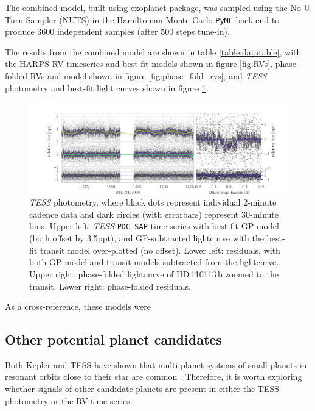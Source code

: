 \documentclass[fleqn,usenatbib]{mnras}
\newcommand{\tess}{{\it TESS}}
\newcommand{\harps}{{HARPS}}
\newcommand{\Tplanet}{HD\,110113\,b}
\begin{document}
The combined model, built using \textsf{exoplanet} \citep{exoplanet} package, was sampled using the No-U Turn Sampler (NUTS) in the Hamiltonian Monte Carlo \texttt{PyMC} back-end \citep{exoplanet:pymc3} to produce 3600 independent samples (after 500 steps tune-in).

The results from the combined model are shown in table \ref{table:datatable}, with the \harps{} RV timeseries and best-fit models shown in figure \ref{fig:RVs}, phase-folded RVs and model shown in figure \ref{fig:phase_fold_rvs}, and \tess{} photometry and best-fit light curves shown in figure \ref{fig:photometry}.

\onecolumn
\begin{figure}
	\includegraphics[width=\textwidth]{Combined_phot_plot_3_GPs}
    \caption{\tess{} photometry, where black dots represent individual 2-minute cadence data and dark circles (with errorbars) represent 30-minute bins. Upper left: \tess{} \texttt{PDC\_SAP} time series with best-fit GP model (both offset by 3.5ppt), and GP-subtracted lightcurve with the best-fit transit model over-plotted (no offset). Lower left: residuals, with both GP model and transit models subtracted from the lightcurve. Upper right: phase-folded lightcurve of \Tplanet{} zoomed to the transit. Lower right: phase-folded residuals. }
    \label{fig:photometry}
\end{figure}
\twocolumn

As a cross-reference, these models were


\subsection{Other potential planet candidates}
Both Kepler and TESS have shown that multi-planet systems of small planets in resonant orbits close to their star are common \citep{?}.
Therefore, it is worth exploring whether signals of other candidate planets are present in either the TESS photometry or the RV time series.
\end{document}
